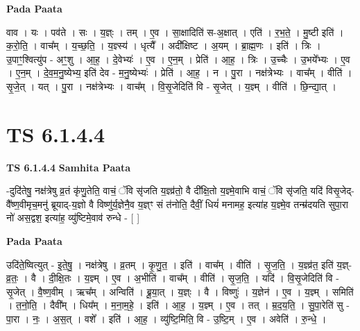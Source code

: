 \documentclass[17pt]{extarticle}
\begin{document}
\textbf{Pada Paata} \newline

वाव । यः । पव॑ते । सः । य॒ज्ञ्ः । तम् । ए॒व । सा॒क्षादिति॑ स-अ॒क्षात् । एति॑ । र॒भ॒ते॒ । मु॒ष्टी इति॑ । क॒रो॒ति॒ । वाच᳚म् । य॒च्छ॒ति॒ । य॒ज्ञ्स्य॑ । धृत्यै᳚ । अदी᳚क्षिष्ट । अ॒यम् । ब्रा॒ह्म॒णः । इति॑ । त्रिः । उ॒पाꣳ॒॒श्वित्यु॑प - अꣳ॒॒शु । आ॒ह॒ । दे॒वेभ्यः॑ । ए॒व । ए॒न॒म् । प्रेति॑ । आ॒ह॒ । त्रिः । उ॒च्चैः । उ॒भये᳚भ्यः । ए॒व । ए॒न॒म् । दे॒व॒म॒नु॒ष्येभ्य॒ इति॑ देव - म॒नु॒ष्येभ्यः॑ । प्रेति॑ । आ॒ह॒ । न । पु॒रा । नक्ष॑त्रेभ्यः । वाच᳚म् । वीति॑ । सृ॒जे॒त् । यत् । पु॒रा । नक्ष॑त्रेभ्यः । वाच᳚म् । वि॒सृ॒जेदिति॑ वि - सृ॒जेत् । य॒ज्ञ्म् । वीति॑ । छि॒न्द्या॒त् ।  \newline





\section{ TS 6.1.4.4 }

\textbf{TS 6.1.4.4 } \newline
\textbf{Samhita Paata} \newline

-दुदि॑तेषु॒ नक्ष॑त्रेषु व्र॒तं कृ॑णु॒तेति॒ वाचं॒ ॅवि सृ॑जति य॒ज्ञ्व्र॑तो॒ वै दी᳚क्षि॒तो य॒ज्ञ्मे॒वाभि वाचं॒ ॅवि सृ॑जति॒ यदि॑ विसृ॒जेद्-वै᳚ष्ण॒वीमृच॒मनु॑ ब्रूयाद्-य॒ज्ञो वै विष्णु॑र्य॒ज्ञेनै॒व य॒ज्ञ्ꣳ सं त॑नोति॒ दैवीं॒ धियं॑ मनामह॒ इत्या॑ह य॒ज्ञ्मे॒व तन्म्र॑दयति सुपा॒रा नो॑ अस॒द्वश॒ इत्या॑ह॒ व्यु॑ष्टिमे॒वाव॑ रुन्धे - [  ] \newline

\textbf{Pada Paata} \newline

उदि॑ते॒ष्वित्युत् - इ॒ते॒षु॒ । नक्ष॑त्रेषु । व्र॒तम् । कृ॒णु॒त॒ । इति॑ । वाच᳚म् । वीति॑ । सृ॒ज॒ति॒ । य॒ज्ञ्व्र॑त॒ इति॑ य॒ज्ञ्-व्र॒तः॒ । वै । दी॒क्षि॒तः । य॒ज्ञ्म् । ए॒व । अ॒भीति॑ । वाच᳚म् । वीति॑ । सृ॒ज॒ति॒ । यदि॑ । वि॒सृ॒जेदिति॑ वि - सृ॒जेत् । वै॒ष्ण॒वीम् । ऋच᳚म् । अन्विति॑ । ब्रू॒या॒त् । य॒ज्ञ्ः । वै । विष्णुः॑ । य॒ज्ञेन॑ । ए॒व । य॒ज्ञ्म् । समिति॑ । त॒नो॒ति॒ । दैवी᳚म् । धिय᳚म् । म॒ना॒म॒हे॒ । इति॑ । आ॒ह॒ । य॒ज्ञ्म् । ए॒व । तत् । म्र॒द॒य॒ति॒ । सु॒पा॒रेति॑ सु - पा॒रा । नः॒ । अ॒स॒त् । वशे᳚ । इति॑ । आ॒ह॒ । व्यु॑ष्टि॒मिति॒ वि - उ॒ष्टि॒म् । ए॒व । अवेति॑ । रु॒न्धे॒ ।  \newline




\end{document}
